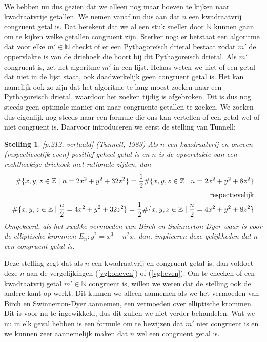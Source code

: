 \documentclass[12pt,reqno]{article}
\newcommand*{\NN}{\ensuremath{\mathbb{N}}}
\newcommand*{\ZZ}{\ensuremath{\mathbb{Z}}}
\theoremstyle{theorem}
\newtheorem{theorem}{Stelling}
\theoremstyle{definition}
\begin{document}
	We hebben nu dus gezien dat we alleen nog maar hoeven te kijken naar kwadraatvrije getallen. We nemen vanaf nu dus aan dat $n$ een kwadraatvrij congruent getal is. Dat betekent dat we al een stuk sneller door $\NN$ kunnen gaan om te kijken welke getallen congruent zijn. Sterker nog: er betstaat een algoritme dat voor elke $m'\in\NN$ checkt of er een Pythagore\"isch drietal bestaat zodat $m'$ de oppervlakte is van de driehoek die hoort bij dit Pythagore\"isch drietal. Als $m'$ congruent is, zet het algoritme $m'$ in een lijst. Helaas weten we niet of een getal dat niet in de lijst staat, ook daadwerkelijk geen congruent getal is. Het kan namelijk ook zo zijn dat het algoritme te lang moest zoeken naar een Pythagore\"isch drietal, waardoor het zoeken tijdig is afgebroken. Dit is dus nog steeds geen optimale manier om naar congruente getallen te zoeken. We zoeken dus eigenlijk nog steeds naar een formule die ons kan vertellen of een getal wel of niet congruent is. Daarvoor introduceren we eerst de stelling van Tunnell:
	\begin{theorem}\label{def:tunnell}
		\cite{Koblitz}[p.212, vertaald] (Tunnell, 1983) Als $n$ een kwadraatvrij en oneven (respectievelijk even) positief geheel getal is en $n$ is de oppervlakte van een rechthoekige driehoek met rationale zijden, dan
		\begin{align}
			\label{vgl:oneven} \#\{x,y,z\in\ZZ \mid n=2x^2+y^2+32z^2\} = \frac{1}{2} \#\{x,y,z\in\ZZ \mid n=2x^2+y^2+8z^2\}\\
			\notag \text{respectievelijk} \\
			\label{vgl:even} \#\{x,y,z\in\ZZ \mid \frac{n}{2}=4x^2+y^2+32z^2\} = \frac{1}{2} \#\{x,y,z\in\ZZ \mid \frac{n}{2}=4x^2+y^2+8z^2\}
		\end{align}
		Omgekeerd, als het zwakke vermoeden van Birch en Swinnerton-Dyer waar is voor de elliptische krommen $E_n:y^2=x^3-n^2x$, dan, impliceren deze gelijkheden dat $n$ een congruent getal is.
	\end{theorem}
	\noindent Deze stelling zegt dat als $n$ een kwadraatvrij en congruent getal is, dan voldoet deze $n$ aan de vergelijkingen (\ref{vgl:oneven}) of (\ref{vgl:even}). Om te checken of een kwadraatvrij getal $m'\in\NN$ congruent is, willen we weten dat de stelling ook de andere kant op werkt. Dit kunnen we alleen aannemen als we het vermoeden van Birch en Swinnerton-Dyer aannemen, een vermoeden over elliptische krommen. Dit is voor nu te ingewikkeld, dus dit zullen we niet verder behandelen. Wat we nu in elk geval hebben is een formule om te bewijzen dat $m'$ niet congruent is en we kunnen zeer aannemelijk maken dat $n$ wel een congruent getal is.
	
\end{document}
